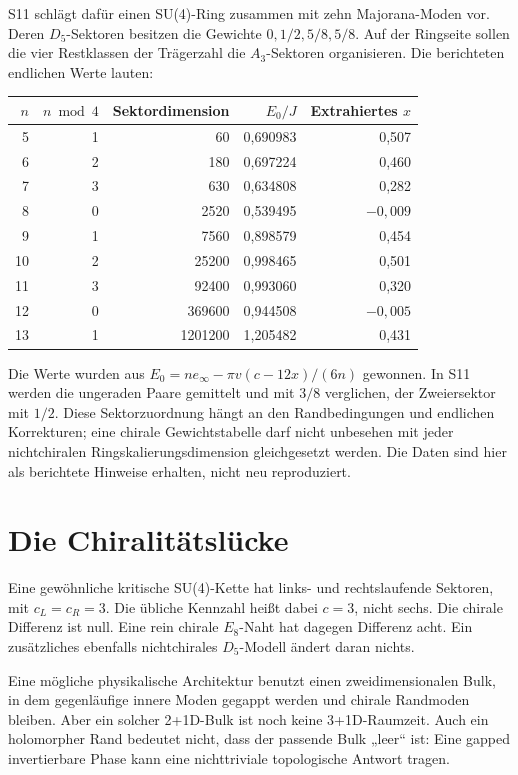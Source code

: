 S11 schlägt dafür einen SU(4)-Ring zusammen mit zehn Majorana-Moden vor. Deren $D_5$-Sektoren besitzen die Gewichte $0,1/2,5/8,5/8$. Auf der Ringseite sollen die vier Restklassen der Trägerzahl die $A_3$-Sektoren organisieren. Die berichteten endlichen Werte lauten:
\begin{center}
\begin{tabular}{rrrrr}
\toprule $n$&$n\bmod4$&Sektordimension&$E_0/J$&Extrahiertes $x$\\\midrule
5&1&60&0,690983&0,507\\
6&2&180&0,697224&0,460\\
7&3&630&0,634808&0,282\\
8&0&2520&0,539495&$-0,009$\\
9&1&7560&0,898579&0,454\\
10&2&25200&0,998465&0,501\\
11&3&92400&0,993060&0,320\\
12&0&369600&0,944508&$-0,005$\\
13&1&1201200&1,205482&0,431\\\bottomrule
\end{tabular}
\end{center}
Die Werte wurden aus $E_0=ne_\infty-\pi v(c-12x)/(6n)$ gewonnen. In S11 werden die ungeraden Paare gemittelt und mit $3/8$ verglichen, der Zweiersektor mit $1/2$. Diese Sektorzuordnung hängt an den Randbedingungen und endlichen Korrekturen; eine chirale Gewichtstabelle darf nicht unbesehen mit jeder nichtchiralen Ringskalierungsdimension gleichgesetzt werden. Die Daten sind hier als berichtete Hinweise erhalten, nicht neu reproduziert.

\section{Die Chiralitätslücke}


Eine gewöhnliche kritische SU(4)-Kette hat links- und rechtslaufende Sektoren, mit $c_L=c_R=3$. Die übliche Kennzahl heißt dabei $c=3$, nicht sechs. Die chirale Differenz ist null. Eine rein chirale $E_8$-Naht hat dagegen Differenz acht. Ein zusätzliches ebenfalls nichtchirales $D_5$-Modell ändert daran nichts.

Eine mögliche physikalische Architektur benutzt einen zweidimensionalen Bulk, in dem gegenläufige innere Moden gegappt werden und chirale Randmoden bleiben. Aber ein solcher 2+1D-Bulk ist noch keine 3+1D-Raumzeit. Auch ein holomorpher Rand bedeutet nicht, dass der passende Bulk „leer“ ist: Eine gapped invertierbare Phase kann eine nichttriviale topologische Antwort tragen.

